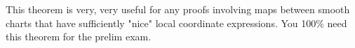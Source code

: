 \nb This theorem is very, very useful for any proofs involving maps between smooth charts that have sufficiently "nice" local coordinate expressions. You 100\% need this theorem for the prelim exam.
































































